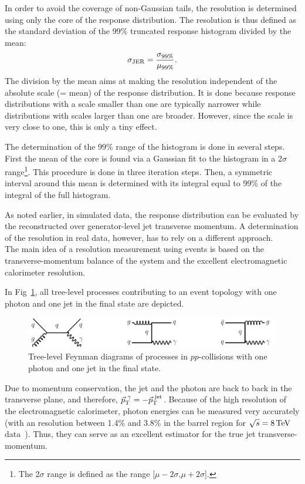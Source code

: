 In order to avoid the coverage of non-Gaussian tails, the resolution is determined using only the core of the response distribution.
The resolution is thus defined as the standard deviation of the 99\% truncated response histogram divided by the mean:
\begin{equation*}\label{res:eq:resolutionFormula}
\sigma_\mathrm{JER} = \frac{\sigma_{99\%}}{\mu_{99\%}}.
\end{equation*}
The division by the mean aims at making the resolution independent of the absolute scale (= mean) of the response distribution.
It is done because response distributions with a scale smaller than one are typically narrower while distributions with scales larger than one are broader.
However, since the scale is very close to one, this is only a tiny effect.

The determination of the 99\% range of the histogram is done in several steps. 
First the mean of the core is found via a Gaussian fit to the histogram in a 2$\sigma$ range\footnote{The 2$\sigma$ range is defined as the range [$\mu - 2\sigma$,$\mu + 2\sigma$].}. 
This procedure is done in three iteration steps.
Then, a symmetric interval around this mean is determined with its integral equal to 99\% of the integral of the full histogram. 

As noted earlier, in simulated data, the response distribution can be evaluated by the reconstructed over generator-level jet transverse momentum.
A determination of the resolution in real data, however, has to rely on a different approach.\\



The main idea of a resolution measurement using \GAMJET events is based on the transverse-momentum balance of the \GAMJET system and the excellent electromagnetic calorimeter resolution.

In Fig~\ref{res:fig:FeynmanDiagrams}, all tree-level processes contributing to an event topology with one photon and one jet in the final state are depicted. 
\begin{figure}[b]
  \centering
      \includegraphics[width=0.99\textwidth]{figures/resolution/generalApproach/FeynmanDiagram.pdf}
  \caption{Tree-level Feynman diagrams of processes in $pp$-collisions with one photon and one jet in the final state.}  
  \label{res:fig:FeynmanDiagrams}
\end{figure}
Due to momentum conservation, the jet and the photon are back to back in the transverse plane, and therefore, $\vec{p}_{\text{T}}^{\,\,\gamma} = -\vec{p}_{\text{T}}^{\,\,\text{jet}}$. 
Because of the high resolution of the electromagnetic calorimeter, photon energies can be measured very accurately (with an resolution between 1.4\% and 3.8\% in the barrel region for $\sqrt{s}=8\,\text{Te}\kern-0.06667em\text{V}$ data~\cite{bib:CMS:PhotonIdentification_8TeV}).
Thus, they can serve as an excellent estimator for the true jet transverse-momentum.


